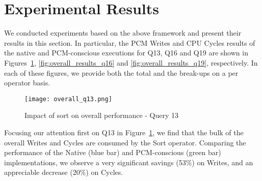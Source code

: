 \begin{figure*}[htpb]
{

}

\caption{ Query plan trees}

\label{fig:plan_trees}

\end{figure*}
\section{Experimental Results}
\label{sec:results}


We conducted experiments based on the above framework and present
their results in this section. In particular, the PCM Writes and CPU Cycles results of the native
and PCM-conscious executions for Q13, Q16 and Q19 are shown in
Figures~\ref{fig:overall_results_q13}, \ref{fig:overall_results_q16}
and \ref{fig:overall_results_q19}, respectively.
In each of these figures, we provide both the total and the break-ups
on a per operator basis.

\begin{figure}[htbp]
  	\texttt{[image: overall\_q13.png]}
	\caption{Impact of sort on overall performance - Query 13}
	\label{fig:overall_results_q13}
\end{figure}
Focusing our attention first on Q13 in
Figure~\ref{fig:overall_results_q13}, we find that the bulk of the
overall Writes and Cycles are consumed by the Sort operator. Comparing
the performance of the Native (blue bar) and PCM-conscious (green bar)
implementations, we observe a very significant savings (53\%) on Writes,
and an appreciable decrease (20\%) on Cycles.

